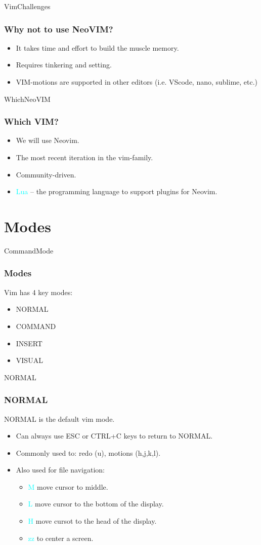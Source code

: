 \documentclass{beamer}
\newcommand{\highlight}[1]{\textcolor{cyan}{\textsf{#1}}}
\begin{document}
\begin{frame}{VimChallenges}
    \frametitle{Why \textbf{not} to use NeoVIM?}
    \begin{itemize}
        \item It takes time and effort to build the muscle memory.
        \item Requires tinkering and setting.
        \item VIM-motions are supported in other editors (i.e. VScode, nano, sublime, etc.)
    \end{itemize}
\end{frame}

\begin{frame}{WhichNeoVIM}
    \frametitle{Which VIM?}
    \begin{itemize}
        \item We will use Neovim.
        \item The most recent iteration in the vim-family.
        \item Community-driven.
        \item \highlight{Lua} -- the programming language to support plugins for Neovim.
    \end{itemize}
\end{frame}

\section{Modes}
\begin{frame}{CommandMode}
    \frametitle{Modes}
    Vim has 4 key modes:
    \begin{itemize}
        \item NORMAL
        \item COMMAND
        \item INSERT
        \item VISUAL
    \end{itemize}
\end{frame}

\begin{frame}{NORMAL}
    \frametitle{NORMAL}
    NORMAL is the default vim mode.
    \begin{itemize}
        \item Can always use ESC or CTRL+C keys to return to NORMAL.
        \item Commonly used to: redo (u), motions (h,j,k,l).
        \item Also used for file navigation:
            \begin{itemize}
                \item \highlight{M} move cursor to middle.
                \item \highlight{L} move cursor to the bottom of the display.
                \item \highlight{H} move cursot to the head of the display.
                \item \highlight{zz} to center a screen.
            \end{itemize}
    \end{itemize}
\end{frame}
\end{document}
